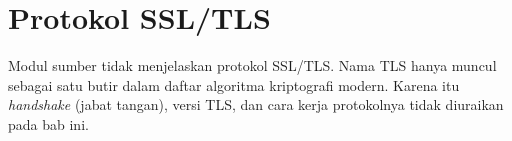 \section{Protokol SSL/TLS}

Modul sumber tidak menjelaskan protokol SSL/TLS. Nama TLS hanya muncul sebagai
satu butir dalam daftar algoritma kriptografi modern. Karena itu
\textit{handshake} (jabat tangan), versi TLS, dan cara kerja protokolnya tidak
diuraikan pada bab ini.

